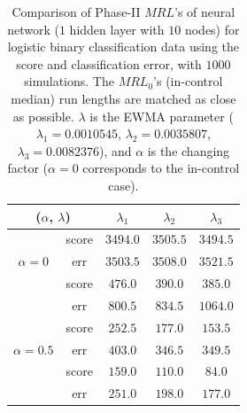 \documentclass[twoside,11pt]{article}
\begin{document}
\begin{appendix}
\begin{table}[H]
\centering
\begin{tabular}{ccccc}
\toprule
\multicolumn{2}{c}{($ \alpha$, $ \lambda$)} & {$ \lambda_1$} & {$ \lambda_2$} & {$ \lambda_3$} \\
\midrule
\multirow{3}{*}{$\alpha=0$} & score &$3494.0$ & $3505.5$ & $3494.5$ \\
& err &$3503.5$ & $3508.0$ & $3521.5$ \\
\midrule
\multirow{3}{*}{$\alpha=0.3$} & score &$\bm{476.0}$ & $\bm{390.0}$ & $\bm{385.0}$ \\
& err &$800.5$ & $834.5$ & $1064.0$ \\
\midrule
\multirow{3}{*}{$\alpha=0.5$} & score &$\bm{252.5}$ & $\bm{177.0}$ & $\bm{153.5}$ \\
& err &$403.0$ & $346.5$ & $349.5$ \\
\midrule
\multirow{3}{*}{$\alpha=0.7$} & score &$\bm{159.0}$ & $\bm{110.0}$ & $\bm{84.0}$ \\
& err &$251.0$ & $198.0$ & $177.0$ \\
\midrule
\end{tabular}
\caption{Comparison of Phase-II $MRL$'s of neural network ($1$ hidden layer with $10$ nodes) for logistic binary classification data using the score and classification error, with $1000$ simulations. The $MRL_0$'s (in-control median) run lengths are matched as close as possible. $ \lambda$ is the EWMA parameter ({$ \lambda_1=0.0010545$}, {$ \lambda_2=0.0035807$}, {$ \lambda_3=0.0082376$}), and $ \alpha$ is the changing factor ($ \alpha=0$ corresponds to the in-control case).}
\label{tab:logi_nnet_MRL}
\end{table}



\end{appendix}
\end{document}
